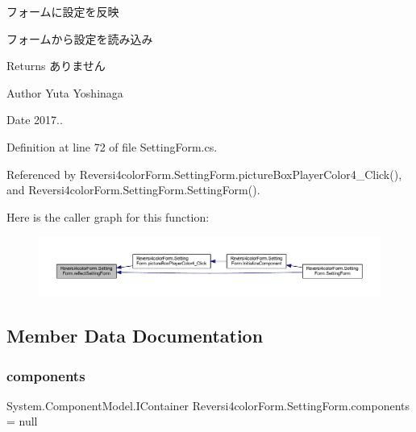 フォームに設定を反映 

フォームから設定を読み込み

\begin{DoxyReturn}{Returns}
ありません 
\end{DoxyReturn}
\begin{DoxyAuthor}{Author}
Yuta Yoshinaga 
\end{DoxyAuthor}
\begin{DoxyDate}{Date}
2017.. 
\end{DoxyDate}


Definition at line 72 of file Setting\+Form.\+cs.



Referenced by Reversi4color\+Form.\+Setting\+Form.\+picture\+Box\+Player\+Color4\+\_\+\+Click(), and Reversi4color\+Form.\+Setting\+Form.\+Setting\+Form().

Here is the caller graph for this function\+:\nopagebreak
\begin{figure}[H]
\begin{center}
\leavevmode
\includegraphics[width=350pt]{class_reversi4color_form_1_1_setting_form_a33a42eed1cef78b8906da8ff65874ecd_icgraph}
\end{center}
\end{figure}


\subsection{Member Data Documentation}
\mbox{\label{class_reversi4color_form_1_1_setting_form_aff2698ca8c13967f78ffa2db8be83d50}} 
\subsubsection{\texorpdfstring{components}{components}}
{\footnotesize\ttfamily System.\+Component\+Model.\+I\+Container Reversi4color\+Form.\+Setting\+Form.\+components = null\hspace{0.3cm}{\ttfamily [private]}}




